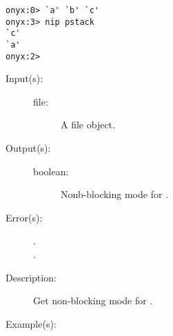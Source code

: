 \begin{description}
\begin{description}
\begin{verbatim}
onyx:0> `a' `b' `c'
onyx:3> nip pstack
`c'
`a'
onyx:2>
		\end{verbatim}
	\end{description}
\label{systemdict:nonblocking}
\item[{\onyxop{file}{nonblocking}{boolean}}: ]
	\begin{description}\item[]
	\item[Input(s): ]
		\begin{description}\item[]
		\item[file: ]
			A file object.
		\end{description}
	\item[Output(s): ]
		\begin{description}\item[]
		\item[boolean: ]
			Nonb-blocking mode for .
		\end{description}
	\item[Error(s): ]
		\begin{description}\item[]
		\item[.]
		\item[.]
		\end{description}
	\item[Description: ]
		Get non-blocking mode for .
	\item[Example(s): ]\begin{verbatim}


\end{verbatim}
\end{description}
\end{description}
